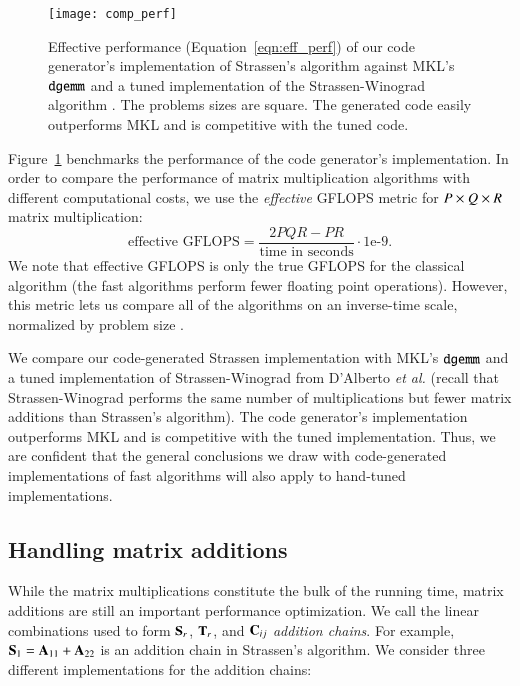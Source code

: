 \documentclass[preprint]{sigplanconf}
\newcommand{\M}[2][]{{\bm{#1\mathbf{\MakeUppercase{#2}}}}}
\begin{document}
\begin{figure}[tb]
\centering
\texttt{[image: comp\_perf]}
\caption{
Effective performance (Equation~\eqref{eqn:eff_perf}) of our code generator's implementation of Strassen's algorithm against MKL's $\texttt{dgemm}$ and a tuned implementation of the Strassen-Winograd algorithm \cite{d2011exploiting}.
The problems sizes are square.
The generated code easily outperforms MKL and is competitive with the tuned code.
}
\label{fig:comp_perf}
\end{figure}

Figure~\ref{fig:comp_perf} benchmarks the performance of the code generator's implementation.
In order to compare the performance of matrix multiplication algorithms with different computational costs,
we use the \emph{effective} GFLOPS metric for $P \times Q \times R$ matrix multiplication:
\begin{equation}
\label{eqn:eff_perf}
\text{effective GFLOPS} = \frac{2PQR-PR}{\text{time in seconds}} \cdot 1\text{e-9}.
\end{equation}
We note that effective GFLOPS is only the true GFLOPS for the classical algorithm
(the fast algorithms perform fewer floating point operations).
However, this metric lets us compare all of the algorithms on an inverse-time scale, normalized by problem size \cite{lipshitz2012communication}.

We compare our code-generated Strassen implementation with MKL's $\texttt{dgemm}$ and a tuned implementation of Strassen-Winograd from D'Alberto \emph{et al.} \cite{d2011exploiting} (recall that Strassen-Winograd performs the same number of multiplications but fewer matrix additions than Strassen's algorithm).
The code generator's implementation outperforms MKL and is competitive with the tuned implementation.
Thus, we are confident that the general conclusions we draw with code-generated implementations of fast algorithms will also apply to hand-tuned implementations.



\subsection{Handling matrix additions}
\label{sec:matrix_additions}

While the matrix multiplications constitute the bulk of the running time,
matrix additions are still an important performance optimization.
We call the linear combinations used to form $\M{S}_r$, $\M{T}_r$, and $\M{C}_{ij}$ \emph{addition chains}.
For example, $\M{S}_1 = \M{A}_{11} + \M{A}_{22}$ is an addition chain in Strassen's algorithm.
We consider three different implementations for the addition chains:
\end{document}
